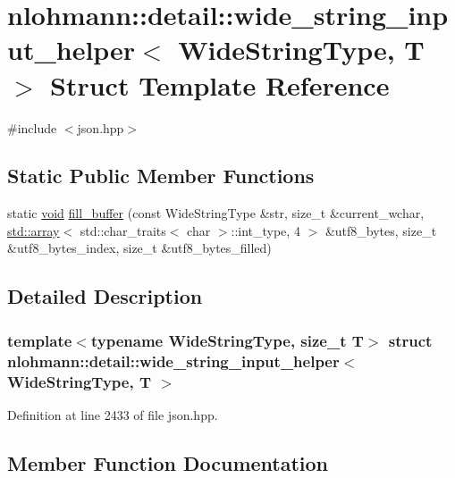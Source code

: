 \hypertarget{structnlohmann_1_1detail_1_1wide__string__input__helper}{}\section{nlohmann\+::detail\+::wide\+\_\+string\+\_\+input\+\_\+helper$<$ Wide\+String\+Type, T $>$ Struct Template Reference}
\label{structnlohmann_1_1detail_1_1wide__string__input__helper}


{\ttfamily \#include $<$json.\+hpp$>$}

\subsection*{Static Public Member Functions}
\begin{DoxyCompactItemize}
\item 
static \mbox{\hyperlink{namespacenlohmann_1_1detail_a59fca69799f6b9e366710cb9043aa77d}{void}} \mbox{\hyperlink{structnlohmann_1_1detail_1_1wide__string__input__helper_ae82d79118fa319a97e4a40568186a922}{fill\+\_\+buffer}} (const Wide\+String\+Type \&str, size\+\_\+t \&current\+\_\+wchar, \mbox{\hyperlink{namespacenlohmann_1_1detail_a1ed8fc6239da25abcaf681d30ace4985af1f713c9e000f5d3f280adbd124df4f5}{std\+::array}}$<$ std\+::char\+\_\+traits$<$ char $>$\+::int\+\_\+type, 4 $>$ \&utf8\+\_\+bytes, size\+\_\+t \&utf8\+\_\+bytes\+\_\+index, size\+\_\+t \&utf8\+\_\+bytes\+\_\+filled)
\end{DoxyCompactItemize}


\subsection{Detailed Description}
\subsubsection*{template$<$typename Wide\+String\+Type, size\+\_\+t T$>$\newline
struct nlohmann\+::detail\+::wide\+\_\+string\+\_\+input\+\_\+helper$<$ Wide\+String\+Type, T $>$}



Definition at line 2433 of file json.\+hpp.



\subsection{Member Function Documentation}
\mbox{\label{structnlohmann_1_1detail_1_1wide__string__input__helper_ae82d79118fa319a97e4a40568186a922}} 
